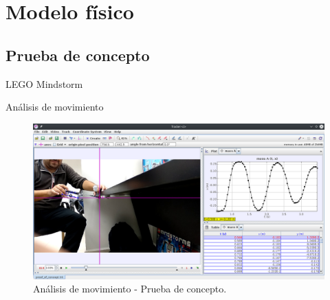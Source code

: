 \documentclass{beamer}
\begin{document}
\section{Modelo físico}

\subsection{Prueba de concepto}
\begin{frame}{LEGO Mindstorm}

\end{frame}

\begin{frame}{Análisis de movimiento}
 \begin{figure}[h]
 \centering
 \includegraphics[scale=0.2]{../Report/img/tracker_poc.png}
 \caption{Análisis de movimiento - Prueba de concepto.}
 \label{fig: tracker main window}
\end{figure}

\end{frame}
\end{document}
